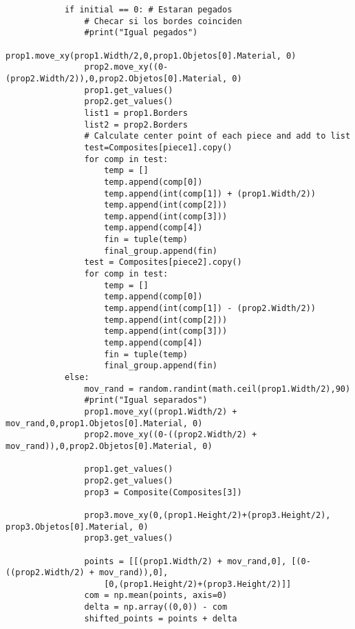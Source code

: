 \begin{verbatim}
            if initial == 0: # Estaran pegados
                # Checar si los bordes coinciden
                #print("Igual pegados")
                prop1.move_xy(prop1.Width/2,0,prop1.Objetos[0].Material, 0)
                prop2.move_xy((0-(prop2.Width/2)),0,prop2.Objetos[0].Material, 0)
                prop1.get_values()
                prop2.get_values()
                list1 = prop1.Borders
                list2 = prop2.Borders
                # Calculate center point of each piece and add to list
                test=Composites[piece1].copy()
                for comp in test:
                    temp = []
                    temp.append(comp[0])
                    temp.append(int(comp[1]) + (prop1.Width/2))
                    temp.append(int(comp[2]))
                    temp.append(int(comp[3]))
                    temp.append(comp[4])
                    fin = tuple(temp)
                    final_group.append(fin)
                test = Composites[piece2].copy()
                for comp in test:
                    temp = []
                    temp.append(comp[0])
                    temp.append(int(comp[1]) - (prop2.Width/2))
                    temp.append(int(comp[2]))
                    temp.append(int(comp[3]))
                    temp.append(comp[4])
                    fin = tuple(temp)
                    final_group.append(fin)
            else:
                mov_rand = random.randint(math.ceil(prop1.Width/2),90)
                #print("Igual separados")
                prop1.move_xy((prop1.Width/2) + mov_rand,0,prop1.Objetos[0].Material, 0)
                prop2.move_xy((0-((prop2.Width/2) + mov_rand)),0,prop2.Objetos[0].Material, 0)

                prop1.get_values()
                prop2.get_values()
                prop3 = Composite(Composites[3])
                
                prop3.move_xy(0,(prop1.Height/2)+(prop3.Height/2), prop3.Objetos[0].Material, 0)
                prop3.get_values()

                points = [[(prop1.Width/2) + mov_rand,0], [(0-((prop2.Width/2) + mov_rand)),0], 
                    [0,(prop1.Height/2)+(prop3.Height/2)]]
                com = np.mean(points, axis=0)
                delta = np.array((0,0)) - com
                shifted_points = points + delta


\end{verbatim}
